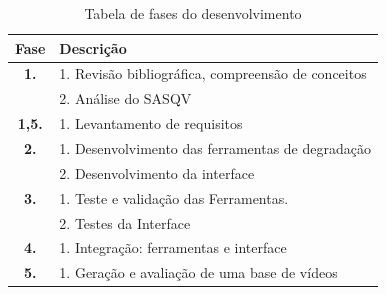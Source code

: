 \begin{table}
	\centering
	\caption{Tabela de fases do desenvolvimento}
	\label{tab:metodologia}
	\begin{tabular}{c|l}
	\hline
	\textbf{Fase} & \textbf{Descrição} \\
	\hline
	\textbf{1.} & 1. Revisão bibliográfica, compreensão de conceitos \\
		& 2. Análise do SASQV \\
	\textbf{1,5.} & 1. Levantamento de requisitos \\
	\textbf{2.} & 1. Desenvolvimento das ferramentas de degradação \\
		& 2. Desenvolvimento da interface \\
	\textbf{3.} & 1. Teste e validação das Ferramentas. \\
		& 2. Testes da Interface \\
	\textbf{4.} & 1. Integração: ferramentas e interface \\
	\textbf{5.} & 1. Geração e avaliação de uma base de vídeos \\
	\hline
	\end{tabular}
\end{table}	
